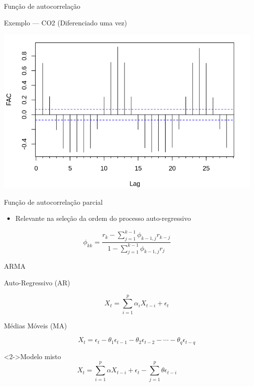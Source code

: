 \documentclass[compress,aspectratio=149,brazil]{beamer}
\begin{document}
\begin{frame}{Função de autocorrelação}
    \begin{block}{Exemplo --- CO2 (Diferenciado uma vez)}
        \begin{center}
            \includegraphics[width=.8\textwidth]{../images/acf_co2_diff.png}
        \end{center}
    \end{block}
\end{frame}

\begin{frame}{Função de autocorrelação parcial}
    \begin{itemize}
        \item Relevante na seleção da ordem do processo auto-regressivo
    \end{itemize}

    \[
    \phi_{kk} = \frac{r_k-\sum_{j=1}^{k-1}{\phi_{k-1,j}r_{k-j}}}{1-\sum_{j=1}^{k-1}{\phi_{k-1,j}r_{j}}}
    \]
\end{frame}

\begin{frame}{ARMA}
    \begin{description}
        \item[Auto-Regressivo (AR)]
            \[
                X_t = \sum_{i = 1}^{p}{\alpha_{i}X_{t-i}} + \epsilon_t
            \]
        \item[Médias Móveis (MA)]
            \[
                X_t = \epsilon_t - \theta_1\epsilon_{t-1} - \theta_2\epsilon_{t-2} - \cdots - \theta_{q}\epsilon_{t-q}
            \]
    \end{description}
    \begin{block}<2->{Modelo misto}
        \[
            X_t = \sum_{i = 1}^{p}{\alpha X_{t-i}} + \epsilon_t - \sum_{j = 1}^{p}{\theta \epsilon_{t-i}}
        \]
    \end{block}
\end{frame}
\end{document}
